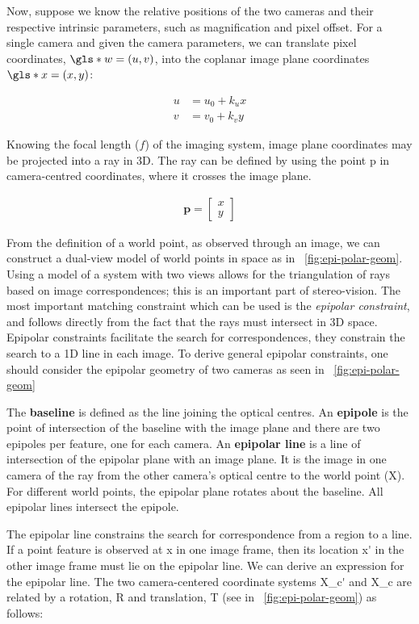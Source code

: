 \documentclass{osa-article}
\begin{document}
Now, suppose we know the relative positions of the two cameras and their respective intrinsic parameters, such as magnification and pixel offset.
For a single camera and given the camera parameters, we can translate pixel coordinates, \(\gls*{w} = (u, v)\), into the coplanar image plane coordinates \(\gls*{x}=(x, y)\):

\begin{align}
  u & = u_0 + k_u x \\
  v & = v_0 + k_v y
\end{align}

Knowing the focal length (\(f\)) of the imaging system, image plane coordinates may be projected into a ray in 3D.
The ray can be defined by using the point \gls*{p} in camera-centred coordinates, where it crosses the image plane.

\begin{align}
  \mathbf{p} = \begin{bmatrix}
    x \\y
  \end{bmatrix}
\end{align}

From the definition of a world point, as observed through an image, we can construct a dual-view model of world points in space as in \figurename~\ref{fig:epi-polar-geom}.
Using a model of a system with two views allows for the triangulation of rays based on image correspondences; this is an important part of stereo-vision.
The most important matching constraint which can be used is the \emph{epipolar constraint}, and follows directly from the fact that the rays must intersect in 3D space.
Epipolar constraints facilitate the search for correspondences, they constrain the search to a 1D line in each image.
To derive general epipolar constraints, one should consider the epipolar geometry of two cameras as seen in \figurename~\ref{fig:epi-polar-geom}


The \textbf{baseline} is defined as the line joining the optical centres.
An \textbf{epipole} is the point of intersection of the baseline with the image plane and there are two epipoles per feature, one for each camera.
An \textbf{epipolar line} is a line of intersection of the epipolar plane with an image plane.
It is the image in one camera of the ray from the other camera’s optical centre to the world point (\gls*{X}).
For different world points, the epipolar plane rotates about the baseline.
All epipolar lines intersect the epipole.

The epipolar line constrains the search for correspondence from a region to a line.
If a point feature is observed at \gls*{x} in one image frame, then its location \gls*{x'} in the other image frame must lie on the epipolar line.
We can derive an expression for the epipolar line.
The two camera-centered coordinate systems \gls*{X_c'} and \gls*{X_c} are related by a rotation, \gls*{R} and translation, \gls*{T} (see in \figurename~\ref{fig:epi-polar-geom}) as follows:
\end{document}
